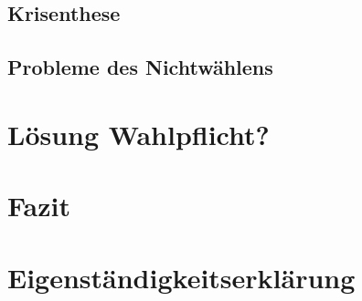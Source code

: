 \documentclass[12pt]{article}
\begin{document}
    \subsection{Krisenthese}

    \subsection{Probleme des Nichtwählens}


    \section{Lösung Wahlpflicht?}


    \section{Fazit}


    \section{Eigenständigkeitserklärung}

    
    
\end{document}
